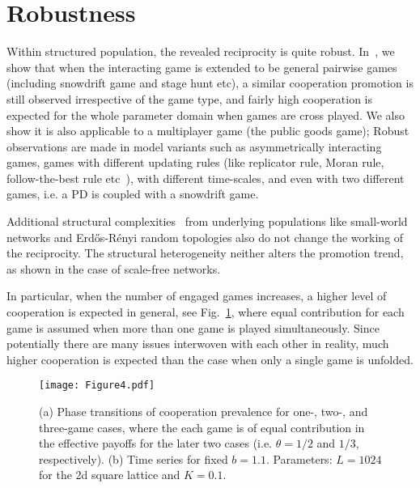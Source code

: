 \documentclass[doublecol]{epl2}
\begin{document}
\section{Robustness} Within structured population, the revealed reciprocity is quite robust. In~\cite{Liang2021arXiv}, we show that when the interacting game is extended to be general pairwise games (including snowdrift game and stage hunt etc), a similar cooperation promotion is still observed irrespective of the game type, and fairly high cooperation is expected for the whole parameter domain when games are cross played. We also show it is also applicable to a multiplayer game (the public goods game); Robust observations are made in model variants such as asymmetrically interacting games, games with different updating rules (like replicator rule, Moran rule, follow-the-best rule etc~\cite{roca2009evolutionary}), with different time-scales, and even with two different games, i.e. a PD is coupled with a snowdrift game.

Additional structural complexities~\cite{Liang2021arXiv} from underlying populations like small-world networks and Erd\H{o}s-R\'enyi random topologies also do not change the working of the reciprocity. The structural heterogeneity neither alters the promotion trend, as shown in the case of scale-free networks.

In particular, when the number of engaged games increases, a higher level of cooperation is expected in general, see Fig.~\ref{fig:more}, where equal contribution for each game is assumed when more than one game is played simultaneously. Since potentially there are many issues interwoven with each other in reality, much higher cooperation is expected than the case when only a single game is unfolded.

\begin{figure}[htbp]
\centering
\texttt{[image: Figure4.pdf]}
\caption{
(a) Phase transitions of cooperation prevalence  for one-, two-, and three-game cases, where the each game is of equal contribution in the effective payoffs for the later two cases (i.e. $\theta=1/2$ and $1/3$, respectively). (b) Time series for fixed $b=1.1$.
Parameters: $L=1024$ for the 2d square lattice and $K=0.1$.
}
\label{fig:more}
\end{figure}
\end{document}
